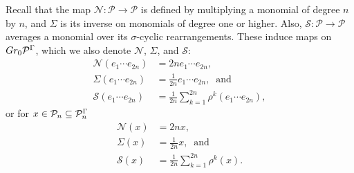 Recall that the map $\mathscr{N}\colon\mathscr{P}\rightarrow\mathscr{P}$ is defined by multiplying a monomial of degree $n$ by $n$, and $\Sigma$ is its inverse on monomials of degree one or higher. Also, $\mathscr{S}\colon \mathscr{P}\rightarrow\mathscr{P}$ averages a monomial over its $\sigma$-cyclic rearrangements. These induce maps on $Gr_0 \mathcal{P}^\Gamma$, which we also denote $\mathscr{N}$, $\Sigma$, and $\mathscr{S}$:
	\begin{align*}
		\mathscr{N}(e_1\cdots e_{2n}) &= 2n e_1\cdots e_{2n},\\
		\Sigma(e_1\cdots e_{2n}) &= \frac{1}{2n} e_1\cdots e_{2n},\ \text{ and}\\
		\mathscr{S}(e_1\cdots e_{2n}) & = \frac{1}{2n}\sum_{k=1}^{2n} \rho^k(e_1\cdots e_{2n}),
	\end{align*}
or for $x\in \mathcal{P}_n\subseteq\mathcal{P}_n^\Gamma$
	\begin{align*}
		\mathscr{N}(x)&=2n x,\\
		\Sigma(x) &= \frac{1}{2n} x,\ \text{ and}\\
		\mathscr{S}(x) &= \frac{1}{2n}\sum_{k=1}^{2n} \rho^k(x).
	\end{align*}

